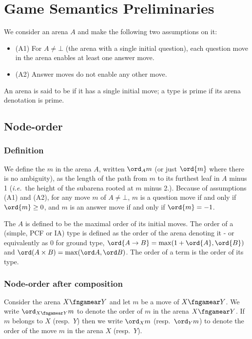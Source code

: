 
\section{Game Semantics Preliminaries}

We consider an arena $A$ and make the following two assumptions on it:
\begin{itemize}
\item (A1) For $A \neq \bot$ (the arena with a single initial question), each question move in the arena enables at least one answer move.
\item (A2) Answer moves do not enable any other move.
\end{itemize}

An arena is said to be  if it has a single initial move; a type is prime if its arena denotation is prime.

\subsection{Node-order}

\subsubsection{Definition}

We define the  $m$ in the arena $A$, written $\ord_A{m}$ (or just $\ord{m}$ where there is no ambiguity), as the length of the path from $m$ to its furthest leaf in $A$ minus 1
({\it i.e.}~the height of the subarena rooted at $m$ minus 2.). Because of assumptions (A1) and (A2),
for any move $m$ of $A \neq \bot$, $m$ is a question move if and only if $\ord{m} \geq 0$, and $m$ is an answer move if and only if $\ord{m} = -1$.

The  $A$ is defined to be the maximal order of its initial moves. The order of a (simple, PCF or IA) type is defined as the order of the arena denoting it - or equivalently as 0 for ground type, $\ord{A\rightarrow B} = \max(1+\ord{A},\ord{B})$ and $\ord(A\times B) = \max(\ord A, \ord B)$. The order of a term is the order of its type.


\subsubsection{Node-order after composition}

Consider the arena $X\fngamear Y$ and let $m$ be a move of
$X\fngamear Y$. We write $\ord_{X\fngamear Y}{m}$ to denote the
order of $m$ in the arena ${X\fngamear Y}$. If $m$ belongs to $X$
(resp.~$Y$) then we write $\ord_X{m}$ (resp.~$\ord_Y{m}$) to denote
the order of the move $m$ in the arena $X$ (resp.~$Y$).

